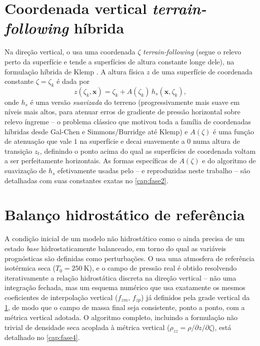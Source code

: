 \section{Coordenada vertical \textit{terrain-following} híbrida}
\label{sec:coord_vertical_teoria}

Na direção vertical, o \mpasa{} usa uma coordenada $\zeta$
\emph{terrain-following} (segue o relevo perto da superfície e tende a
superfícies de altura constante longe dele), na formulação híbrida de
Klemp \cite{klemp2011terrainfollowing}. A altura física $z$ de uma
superfície de coordenada constante $\zeta=\zeta_k$ é dada por
\begin{equation}
  z(\zeta_k, \mathbf{x}) = \zeta_k + A(\zeta_k)\, h_s(\mathbf{x}, \zeta_k),
  \label{eq:coord_hibrida_teoria}
\end{equation}
onde $h_s$ é uma versão \emph{suavizada} do terreno (progressivamente
mais suave em níveis mais altos, para atenuar erros de gradiente de
pressão horizontal sobre relevo íngreme -- o problema clássico que
motivou toda a família de coordenadas híbridas desde Gal-Chen e
Simmons/Burridge até Klemp) e $A(\zeta)$ é uma função de atenuação que
vale $1$ na superfície e decai suavemente a $0$ numa altura de transição
$z_t$, definindo o ponto acima do qual as superfícies de coordenada
voltam a ser perfeitamente horizontais. As formas específicas de
$A(\zeta)$ e do algoritmo de suavização de $h_s$ efetivamente usadas pelo
\mpasa{} -- e reproduzidas neste trabalho -- são detalhadas com suas
constantes exatas no \cref{cap:fase2}.

\section{Balanço hidrostático de referência}
\label{sec:hidrostatico_teoria}

A condição inicial de um modelo não hidrostático como o \mpasa{} ainda
precisa de um estado \emph{base} hidrostaticamente balanceado, em torno
do qual as variáveis prognósticas são definidas como perturbações. O
\mpasa{} usa uma atmosfera de referência isotérmica seca
($T_0=\SI{250}{\kelvin}$), e o campo de pressão real é obtido resolvendo
iterativamente a relação hidrostática discreta na direção vertical --
não uma integração fechada, mas um esquema numérico que usa exatamente
os mesmos coeficientes de interpolação vertical ($f_{zm}$, $f_{zp}$) já
definidos pela grade vertical da \cref{sec:coord_vertical_teoria}, de
modo que o campo de massa final seja consistente, ponto a ponto, com a
métrica vertical adotada. O algoritmo completo, incluindo a formulação
não trivial de densidade seca acoplada à métrica vertical
($\rho_{zz}=\rho/\partial z/\partial \zeta$), está detalhado no
\cref{cap:fase4}.
